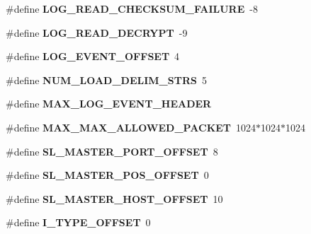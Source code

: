 \begin{DoxyCompactItemize}
\mbox{\label{group__Replication_gad8d8366368de1ae685ac1513b50ea522}} 
\#define {\bfseries L\+O\+G\+\_\+\+R\+E\+A\+D\+\_\+\+C\+H\+E\+C\+K\+S\+U\+M\+\_\+\+F\+A\+I\+L\+U\+RE}~-\/8
\item 
\mbox{\label{group__Replication_ga876b42b8a1947f23b0c14aa8eff76661}} 
\#define {\bfseries L\+O\+G\+\_\+\+R\+E\+A\+D\+\_\+\+D\+E\+C\+R\+Y\+PT}~-\/9
\item 
\mbox{\label{group__Replication_gaeee697f645a1dc11c537f46d82909352}} 
\#define {\bfseries L\+O\+G\+\_\+\+E\+V\+E\+N\+T\+\_\+\+O\+F\+F\+S\+ET}~4
\item 
\mbox{\label{group__Replication_gaea6118195553abe8beb8bd1dd6691d46}} 
\#define {\bfseries N\+U\+M\+\_\+\+L\+O\+A\+D\+\_\+\+D\+E\+L\+I\+M\+\_\+\+S\+T\+RS}~5
\item 
\#define {\bfseries M\+A\+X\+\_\+\+L\+O\+G\+\_\+\+E\+V\+E\+N\+T\+\_\+\+H\+E\+A\+D\+ER}
\item 
\mbox{\label{group__Replication_ga7bd10b01f4606025e5d1c596d46b303d}} 
\#define {\bfseries M\+A\+X\+\_\+\+M\+A\+X\+\_\+\+A\+L\+L\+O\+W\+E\+D\+\_\+\+P\+A\+C\+K\+ET}~1024$\ast$1024$\ast$1024
\item 
\mbox{\label{group__Replication_gaf491bb80b5a3a0caf79ecf3bf1af708a}} 
\#define {\bfseries S\+L\+\_\+\+M\+A\+S\+T\+E\+R\+\_\+\+P\+O\+R\+T\+\_\+\+O\+F\+F\+S\+ET}~8
\item 
\mbox{\label{group__Replication_gab645c64c9751e37e6c6ee8237dde80ad}} 
\#define {\bfseries S\+L\+\_\+\+M\+A\+S\+T\+E\+R\+\_\+\+P\+O\+S\+\_\+\+O\+F\+F\+S\+ET}~0
\item 
\mbox{\label{group__Replication_ga0c009f3e8b5b51b34e3a765dbc6f6072}} 
\#define {\bfseries S\+L\+\_\+\+M\+A\+S\+T\+E\+R\+\_\+\+H\+O\+S\+T\+\_\+\+O\+F\+F\+S\+ET}~10
\item 
\mbox{\label{group__Replication_gacbfec66bfb3a326b084c66f7d737f53e}} 
\#define {\bfseries I\+\_\+\+T\+Y\+P\+E\+\_\+\+O\+F\+F\+S\+ET}~0
\item 
\mbox{\label{group__Replication_ga97debfb1467be5a7b75a016b4a242ebb}} 

\end{DoxyCompactItemize}
